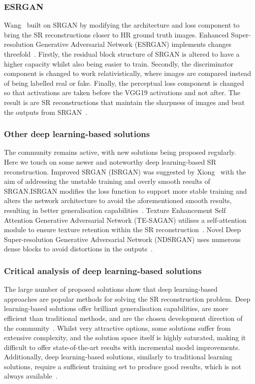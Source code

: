 \subsubsection{ESRGAN}
Wang \etal\ built on SRGAN by modifying the architecture and loss component to bring the SR reconstructions closer to HR ground truth images. Enhanced Super-resolution Generative Adversarial Network (ESRGAN) implements changes threefold~\cite{esrgan}. Firstly, the residual block structure of SRGAN is altered to have a higher capacity whilst also being easier to train. Secondly, the discriminator component is changed to work relativistically, where images are compared instead of being labelled real or fake. Finally, the perceptual loss component is changed so that activations are taken before the VGG19 activations and not after. The result is are SR reconstructions that maintain the sharpness of images and beat the outputs from SRGAN~\cite{esrgan}.

\subsubsection{Other deep learning-based solutions}
The community remains active, with new solutions being proposed regularly. Here we touch on some newer and noteworthy deep learning-based SR reconstruction. Improved SRGAN (ISRGAN) was suggested by Xiong \etal\ with the aim of addressing the unstable training and overly smooth results of SRGAN.\@ ISRGAN modifies the loss function to support more stable training and alters the network architecture to  avoid the aforementioned smooth results, resulting in better generalisation capabilities~\cite{isrgan,remoteSensingGANsReview}. Texture Enhancement Self Attention Generative Adversarial Network (TE-SAGAN) utilises a self-attention module to ensure texture retention within the SR reconstruction~\cite{tesagan, remoteSensingGANsReview}. Novel Deep Super-resolution Generative Adversarial Network (NDSRGAN) uses numerous dense blocks to avoid distortions in the outputs~\cite{ndsrgan, remoteSensingGANsReview}. 

\subsubsection{Critical analysis of deep learning-based solutions}
The large number of proposed solutions show that deep learning-based approaches are popular methods for solving the SR reconstruction problem. Deep learning-based solutions offer brilliant generalisation capabilities, are more efficient than traditional methods, and are the chosen development direction of the community~\cite{ndsrgan}. Whilst very attractive options, some solutions suffer from extensive complexity, and the solution space itself is highly saturated, making it difficult to offer state-of-the-art results with incremental model improvements. Additionally, deep learning-based solutions, similarly to traditional learning solutions, require a sufficient training set to produce good results, which is not always available~\cite{superResRemoteSensingOverview}.

